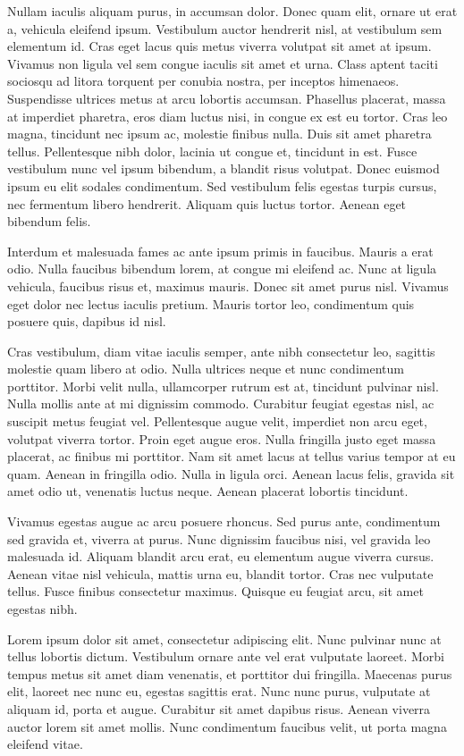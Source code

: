 \initial Nullam iaculis aliquam purus, in accumsan dolor. Donec quam elit, ornare ut erat a, vehicula eleifend ipsum. Vestibulum auctor hendrerit nisl, at vestibulum sem elementum id. Cras eget lacus quis metus viverra volutpat sit amet at ipsum. Vivamus non ligula vel sem congue iaculis sit amet et urna. Class aptent taciti sociosqu ad litora torquent per conubia nostra, per inceptos himenaeos. Suspendisse ultrices metus at arcu lobortis accumsan. Phasellus placerat, massa at imperdiet pharetra, eros diam luctus nisi, in congue ex est eu tortor. Cras leo magna, tincidunt nec ipsum ac, molestie finibus nulla. Duis sit amet pharetra tellus. Pellentesque nibh dolor, lacinia ut congue et, tincidunt in est. Fusce vestibulum nunc vel ipsum bibendum, a blandit risus volutpat. Donec euismod ipsum eu elit sodales condimentum. Sed vestibulum felis egestas turpis cursus, nec fermentum libero hendrerit. Aliquam quis luctus tortor. Aenean eget bibendum felis.

Interdum et malesuada fames ac ante ipsum primis in faucibus. Mauris a erat odio. Nulla faucibus bibendum lorem, at congue mi eleifend ac. Nunc at ligula vehicula, faucibus risus et, maximus mauris. Donec sit amet purus nisl. Vivamus eget dolor nec lectus iaculis pretium. Mauris tortor leo, condimentum quis posuere quis, dapibus id nisl.

Cras vestibulum, diam vitae iaculis semper, ante nibh consectetur leo, sagittis molestie quam libero at odio. Nulla ultrices neque et nunc condimentum porttitor. Morbi velit nulla, ullamcorper rutrum est at, tincidunt pulvinar nisl. Nulla mollis ante at mi dignissim commodo. Curabitur feugiat egestas nisl, ac suscipit metus feugiat vel. Pellentesque augue velit, imperdiet non arcu eget, volutpat viverra tortor. Proin eget augue eros. Nulla fringilla justo eget massa placerat, ac finibus mi porttitor. Nam sit amet lacus at tellus varius tempor at eu quam. Aenean in fringilla odio. Nulla in ligula orci. Aenean lacus felis, gravida sit amet odio ut, venenatis luctus neque. Aenean placerat lobortis tincidunt.

Vivamus egestas augue ac arcu posuere rhoncus. Sed purus ante, condimentum sed gravida et, viverra at purus. Nunc dignissim faucibus nisi, vel gravida leo malesuada id. Aliquam blandit arcu erat, eu elementum augue viverra cursus. Aenean vitae nisl vehicula, mattis urna eu, blandit tortor. Cras nec vulputate tellus. Fusce finibus consectetur maximus. Quisque eu feugiat arcu, sit amet egestas nibh.

Lorem ipsum dolor sit amet, consectetur adipiscing elit. Nunc pulvinar nunc at tellus lobortis dictum. Vestibulum ornare ante vel erat vulputate laoreet. Morbi tempus metus sit amet diam venenatis, et porttitor dui fringilla. Maecenas purus elit, laoreet nec nunc eu, egestas sagittis erat. Nunc nunc purus, vulputate at aliquam id, porta et augue. Curabitur sit amet dapibus risus. Aenean viverra auctor lorem sit amet mollis. Nunc condimentum faucibus velit, ut porta magna eleifend vitae.

